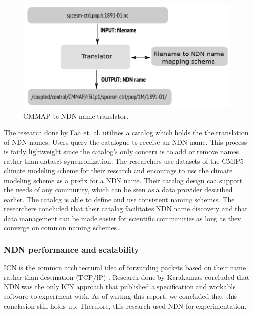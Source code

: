\begin{figure}[H]
\centering
\includegraphics[scale=0.4]{Images/cmip2ndn.png}
\caption{CMMAP to NDN name translator.}
\label{fig:cmmap_ndnn}
\end{figure}

The research done by Fan et. al. utilizes a catalog which holds the the translation of NDN names. Users query the catalogue to receive an NDN name. This process is fairly lightweight since the catalog's only concern is to add or remove names rather than dataset synchronization. The researchers use datasets of the CMIP5 climate modeling scheme for their research and encourage to use the climate modeling scheme as a prefix for a NDN name. 
Their catalog design can support the needs of any community, which can be seen as a data provider described earlier. The catalog is able to define and use consistent naming schemes.
The researchers concluded that their catalog facilitates NDN name discovery and that data management can be made easier for scientific communities as long as they converge on common naming schemes \cite{ndn-man}. 

\subsubsection{NDN performance and scalability}
\label{introduction-related-work-ndn}
ICN is the common architectural idea of forwarding packets based on their name rather than destination (TCP/IP) \cite{jacobson2009networking}. Research done by Karakannas \cite{icn-bd} concluded that NDN was the only ICN approach that published a specification and workable software to experiment with. As of writing this report, we concluded that this conclusion still holds up. Therefore, this research used NDN for experimentation.

